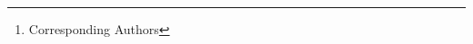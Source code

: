 \author{
Kim Jun-Seong$^{1}$ \qquad
GeonU Kim$^{1}$ \qquad
Kim Yu-Ji$^{1}$ \qquad 
Yu-Chiang Frank Wang$^{2}$ \\
Jaesung Choe$^{2}$\thanks{Corresponding Authors} \qquad 
Tae-Hyun Oh$^{3\ast}$ \\
\\
{$^{1}$POSTECH} \quad
{$^{2}$NVIDIA}  \quad
{$^{3}$KAIST}  \quad
\vspace{-4mm}
}